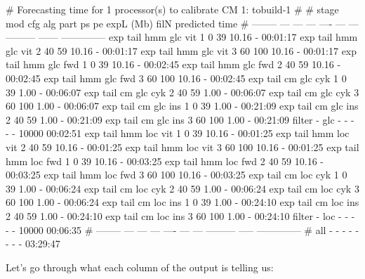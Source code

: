\begin{sreoutput}
# Forecasting time for 1 processor(s) to calibrate CM 1: tobuild-1
#
# stage     mod  cfg  alg  part  ps  pe expL (Mb)   filN predicted time
# --------  ---  ---  ---  ---- --- --- --------- ------ --------------
  exp tail  hmm  glc  vit     1   0  39     10.16      -       00:01:17
  exp tail  hmm  glc  vit     2  40  59     10.16      -       00:01:17
  exp tail  hmm  glc  vit     3  60 100     10.16      -       00:01:17
  exp tail  hmm  glc  fwd     1   0  39     10.16      -       00:02:45
  exp tail  hmm  glc  fwd     2  40  59     10.16      -       00:02:45
  exp tail  hmm  glc  fwd     3  60 100     10.16      -       00:02:45
  exp tail   cm  glc  cyk     1   0  39      1.00      -       00:06:07
  exp tail   cm  glc  cyk     2  40  59      1.00      -       00:06:07
  exp tail   cm  glc  cyk     3  60 100      1.00      -       00:06:07
  exp tail   cm  glc  ins     1   0  39      1.00      -       00:21:09
  exp tail   cm  glc  ins     2  40  59      1.00      -       00:21:09
  exp tail   cm  glc  ins     3  60 100      1.00      -       00:21:09
  filter      -  glc    -     -   -   -         -  10000       00:02:51
  exp tail  hmm  loc  vit     1   0  39     10.16      -       00:01:25
  exp tail  hmm  loc  vit     2  40  59     10.16      -       00:01:25
  exp tail  hmm  loc  vit     3  60 100     10.16      -       00:01:25
  exp tail  hmm  loc  fwd     1   0  39     10.16      -       00:03:25
  exp tail  hmm  loc  fwd     2  40  59     10.16      -       00:03:25
  exp tail  hmm  loc  fwd     3  60 100     10.16      -       00:03:25
  exp tail   cm  loc  cyk     1   0  39      1.00      -       00:06:24
  exp tail   cm  loc  cyk     2  40  59      1.00      -       00:06:24
  exp tail   cm  loc  cyk     3  60 100      1.00      -       00:06:24
  exp tail   cm  loc  ins     1   0  39      1.00      -       00:24:10
  exp tail   cm  loc  ins     2  40  59      1.00      -       00:24:10
  exp tail   cm  loc  ins     3  60 100      1.00      -       00:24:10
  filter      -  loc    -     -   -   -         -  10000       00:06:35
# --------  ---  ---  ---  ---- --- --- ---------  ----- --------------
# all         -    -    -     -   -   -         -      -       03:29:47
\end{sreoutput}

Let's go through what each column of the output is telling us:

